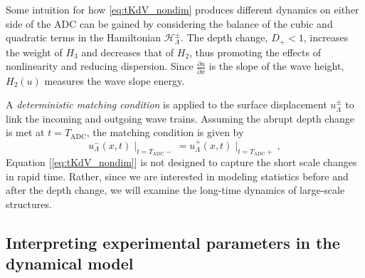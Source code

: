 \documentclass[9pt,twocolumn,twoside,lineno]{pnas-new}
\begin{document}
Some intuition for how \eqref{eq:tKdV_nondim} produces different dynamics on either side of the ADC can be gained by considering the balance of the cubic and quadratic terms in the Hamiltonian $\mathcal{H}_{\Lambda}^{\pm}$. The depth change, $D_{+}<1$, increases the weight of $H_3$ and decreases that of $H_2$, thus promoting the effects of nonlinearity and reducing dispersion.
Since $\frac{\partial u}{\partial x}$ is the slope of the wave height, $H_{2}\left(u\right)$ measures the
wave slope energy.

A \emph{deterministic matching condition} is applied to the surface displacement $u_{\Lambda}^{\pm}$ to link the incoming and outgoing wave trains. Assuming the abrupt depth change is met at $t=T_{\mathrm{ADC}}$, the matching condition is given by
\[
u_{\Lambda}^{-}\left(x,t\right)\mid_{t=T_{\mathrm{ADC}}-}=u_{\Lambda}^{+}\left(x,t\right)\mid_{t=T_{\mathrm{ADC}}+},
\]
Equation [\ref{eq:tKdV_nondim}] is not designed to capture the short
scale changes in rapid time. 
Rather, since we are interested in modeling statistics before and after the depth change, we will examine the long-time dynamics of large-scale structures.



\subsection{Interpreting experimental parameters in the dynamical model}
\end{document}
